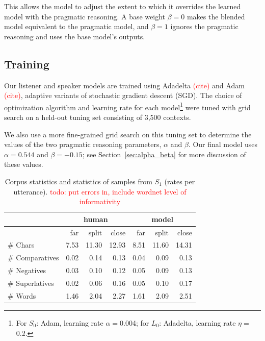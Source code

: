 \documentclass[11pt,letterpaper]{article}
\newcommand{\Listener}{L}
\newcommand{\Speaker}{S}
\renewcommand{\|}{\mid}
\newcommand{\secref}[1]{Section~\ref{#1}}
\newcommand{\todocheck}[1]{\textcolor{red}{#1}}
\begin{document}
This allows the model to adjust the extent to which it overrides the learned model
with the pragmatic reasoning. A base weight $\beta = 0$ makes the blended model
equivalent to the pragmatic model, and $\beta = 1$ ignores the pragmatic reasoning
and uses the base model's outputs.

\subsection{Training} \label{sec:training}

Our listener and speaker models are trained using Adadelta \todocheck{(cite)} and
Adam \todocheck{(cite)}, adaptive variants of stochastic gradient descent (SGD).
The choice of optimization algorithm and learning rate for each model\footnote{For
$\Speaker_0$: Adam, learning rate $\alpha = {}$0.004; for $\Listener_0$: Adadelta,
learning rate $\eta = {}$0.2.}
were tuned with grid search on a held-out tuning set consisting of 3,500 contexts.

We also use a more fine-grained grid search on this tuning set to determine the
values of the two pragmatic reasoning parameters, $\alpha$ and $\beta$.
Our final model uses
$\alpha = 0.544$ and $\beta = -0.15$; see \secref{sec:alpha_beta} for more
discussion of these values.

\begin{table}[ht]
\centering
\begin{tabular}{lrrr|rrr}
  & \multicolumn{3}{c}{human}& \multicolumn{3}{c}{model}\\ \hline
  & far& split& close& far& split& close\\ \hline
\# Chars & 7.53 & 11.30 & 12.93 & 8.51 & 11.60 & 14.31 \\ 
  \# Comparatives & 0.02 & 0.14 & 0.13 & 0.04 & 0.09 & 0.13 \\ 
  \# Negatives & 0.03 & 0.10 & 0.12 & 0.05 & 0.09 & 0.13 \\ 
  \# Superlatives & 0.02 & 0.06 & 0.16 & 0.05 & 0.10 & 0.17 \\ 
  \# Words & 1.46 & 2.04 & 2.27 & 1.61 & 2.09 & 2.51 \\ 
   \hline
\end{tabular}
\caption{Corpus statistics and statistics of samples from $\Speaker_1$ (rates per utterance). \todocheck{todo: put errors in, include wordnet level of informativity}} \label{table:metrics}
\end{table}
\end{document}

